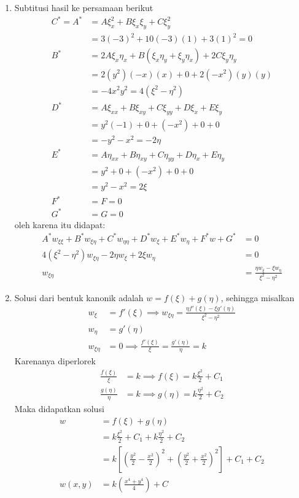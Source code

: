 \documentclass[a4paper]{article}
\theoremstyle{definition}
\begin{document}
\begin{enumerate}
  \item Subtitusi hasil ke persamaan berikut
  \begin{align*}
    C^* = A^* &= A\xi_x^2 + B\xi_x \xi_y + C\xi_y^2\\
    &= 3(-3)^2 + 10(-3)(1) + 3(1)^2= 0 \\
    B^* &= 2A\xi_x \eta_x + B(\xi_x \eta_y + \xi_y \eta_x) + 2C\xi_y \eta_y \\
    &= 2(y^2)(-x)(x) + 0 + 2(-x^2)(y)(y) \\
    &= -4x^2 y^2 = 4(\xi^2 - \eta^2) \\
D^* &= A\xi_{xx} + B\xi_{xy} + C\xi_{yy} + D\xi_x + E\xi_y \\
    &= y^2(-1) + 0 + (-x^2) + 0 + 0 \\
    &= -y^2 - x^2 = -2\eta  \\
E^* &= A\eta_{xx} + B\eta_{xy} + C\eta_{yy} + D\eta_x + E\eta_y \\
    &= y^2 + 0 + (-x^2) + 0 + 0 \\
    &= y^2 - x^2 = 2\xi  \\
F^* &= F = 0  \\
G^* &= G = 0 
  \end{align*}
  oleh karena itu didapat:
\begin{align*}
A^* w_{\xi\xi} + B^* w_{\xi\eta} + C^* w_{\eta\eta} + D^* w_{\xi} + E^* w_{\eta} + F^* w + G^* &= 0 \\
4(\xi^2 - \eta^2) w_{\xi\eta} - 2\eta w_{\xi} + 2\xi w_{\eta} &= 0 \\
w_{\xi\eta} &= \frac{\eta w_{\xi} - \xi w_{\eta}}{\xi^2 - \eta^2} 
\end{align*}
  
  \item Solusi dari bentuk kanonik adalah $w = f(\xi) + g(\eta)$, sehingga misalkan 
  \begin{align*}
    w_{\xi} &= f'(\xi) \implies w_{\xi\eta} = \frac{\eta f'(\xi) - \xi g'(\eta)}{\xi^2 - \eta^2} \\
    w_{\eta} &= g'(\eta) \\
    w_{\xi\eta} &= 0 \implies \frac{f'(\xi)}{\xi}= \frac{g'(\eta)}{\eta} = k
  \end{align*}
  Karenanya diperlorek
  \begin{align*}
    \frac{f(\xi)}{\xi} &= k \implies f(\xi) = k \frac{\xi^2}{2} + C_1 \\
    \frac{g(\eta)}{\eta} &= k \implies g(\eta) = k \frac{\eta^2}{2} + C_2 
  \end{align*}
  Maka didapatkan solusi 
  \begin{align*}
    w &= f(\xi) + g(\eta) \\
    &= k \frac{\xi^2}{2} + C_1 + k \frac{\eta^2}{2} + C_2 \\
    &= k \left[ (\frac{y^2}{2} - \frac{x^2}{2})^2 + (\frac{y^2}{2} + \frac{x^2}{2})^2 \right] + C_1 + C_2 \\
    w(x,y)&= k \left( \frac{x^4 + y^4}{4} \right) + C
  \end{align*}
\end{enumerate}
\end{document}
